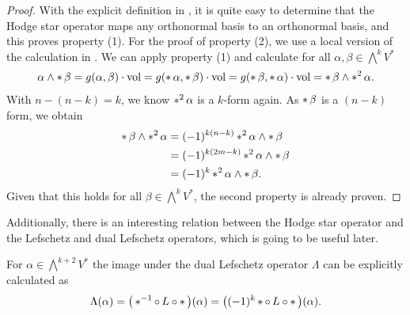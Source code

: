 \begin{proof}
	With the explicit definition in , it is quite easy to determine
	that the Hodge star operator maps any orthonormal basis to an orthonormal basis, and this proves
	property (1).
	For the proof of property (2), we use a local version of the calculation in  \cite[Lemma 5.5]{Voisin2002}. 
	We can apply property (1) and calculate for all $\alpha,\beta \in\bigwedge^kV^*$
	\begin{align*}
		\alpha\wedge\operatorname{\ast}\beta = g(\alpha, \beta) \cdot \operatorname{vol} = g(\operatorname{\ast}\alpha,\operatorname{\ast}\beta)
		\cdot \operatorname{vol} = g(\operatorname{\ast}\beta,\operatorname{\ast}\alpha) \cdot \operatorname{vol} = \operatorname{\ast}\beta \wedge \operatorname{\ast}^2
		\alpha.
	\end{align*}
	With $n-(n-k) = k$, we know $\operatorname{\ast}^2 \alpha$ is a $k$-form again. As $\operatorname{\ast}\beta$ is a
	$(n-k)$ form, we obtain
	\begin{align*}
		\operatorname{\ast}\beta \wedge \operatorname{\ast}^2\alpha &= (-1)^{k(n-k)} \operatorname{\ast}^2 \alpha \wedge \operatorname{\ast}
		\beta \\&= (-1)^{k(2m-k)} \operatorname{\ast}^2\alpha\wedge\operatorname{\ast}\beta\\ &= (-1)^k \operatorname{\ast}^2 \alpha
		\wedge \operatorname{\ast}\beta.
	\end{align*}
	Given that this holds for all $\beta \in \bigwedge^kV^*$, the second property is already proven.
\end{proof}
Additionally, there is an interesting relation between the Hodge star operator and the Lefschetz and
dual Lefschetz operators, which is going to be useful later.
\begin{lm}
	\label{loc-theory:lm:formula-for-the-dual-lefschetz-operator}
	For $\alpha \in \bigwedge^{k+2} V^*$ the image under the dual Lefschetz operator $\Lambda$ can be
	explicitly calculated as
	\begin{align*}
		\Lambda (\alpha) = \big(\operatorname{\ast}^{-1} \circ \,L \circ \operatorname{\ast}\big)(\alpha) = \big( (-1)^k
		\operatorname{\ast} \circ \,L \circ \operatorname{\ast} \big)(\alpha).
	\end{align*}
\end{lm}
